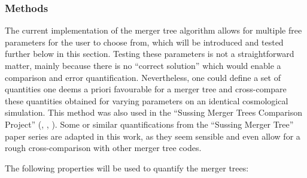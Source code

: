 \subsubsection{Methods}
The current implementation of the merger tree algorithm allows for multiple free parameters for the user to choose from, which will be introduced and tested further below in this section.
Testing these parameters is not a straightforward matter, mainly because there is no ``correct solution'' which would enable a comparison and error quantification.
Nevertheless, one could define a set of quantities one deems a priori favourable for a merger tree and cross-compare these quantities obtained for varying parameters on an identical cosmological simulation.
This method was also used in the ``Sussing Merger Trees Comparison Project'' (\cite{SUSSING_COMPARISON}, \cite{SUSSING_CONVERGENCE}, \cite{SUSSING_HALOFINDER}).
Some or similar quantifications from the ``Sussing Merger Tree'' paper series are adapted in this work, as they seem sensible and even allow for a rough cross-comparison with other merger tree codes.

The following properties will be used to quantify the merger trees:

